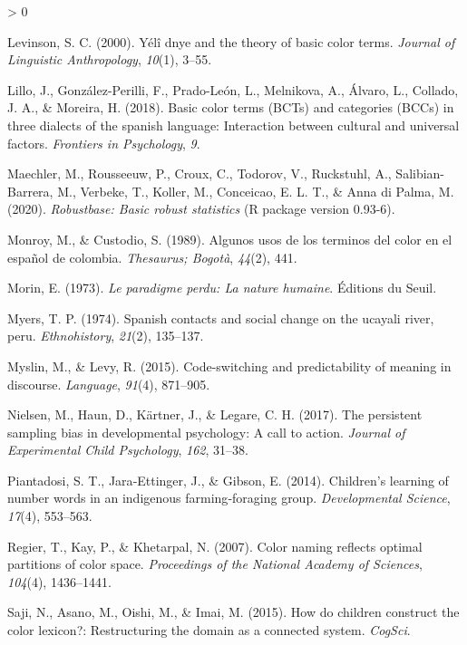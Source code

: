 \documentclass[
  english,
  ,apa7,floatsintext]{apa6}
\newlength{\cslhangindent}
\newenvironment{CSLReferences}[2] %
 {%
  \setlength{\parindent}{0pt}
  \ifodd #1 \everypar{\setlength{\hangindent}{\cslhangindent}}\ignorespaces\fi
  \ifnum #2 > 0
  \setlength{\parskip}{#2\baselineskip}
  \fi
 }%
 {}
\begin{document}
\begin{CSLReferences}{1}{0}
\leavevmode\hypertarget{ref-levinson2000}{}%
Levinson, S. C. (2000). Yélî dnye and the theory of basic color terms. \emph{Journal of Linguistic Anthropology}, \emph{10}(1), 3--55.

\leavevmode\hypertarget{ref-lillo2018}{}%
Lillo, J., González-Perilli, F., Prado-León, L., Melnikova, A., Álvaro, L., Collado, J. A., \& Moreira, H. (2018). Basic color terms (BCTs) and categories (BCCs) in three dialects of the spanish language: Interaction between cultural and universal factors. \emph{Frontiers in Psychology}, \emph{9}.

\leavevmode\hypertarget{ref-R-robustbase}{}%
Maechler, M., Rousseeuw, P., Croux, C., Todorov, V., Ruckstuhl, A., Salibian-Barrera, M., Verbeke, T., Koller, M., Conceicao, E. L. T., \& Anna di Palma, M. (2020). \emph{Robustbase: Basic robust statistics} (R package version 0.93-6).

\leavevmode\hypertarget{ref-monroy1989}{}%
Monroy, M., \& Custodio, S. (1989). Algunos usos de los terminos del color en el espa{ñ}ol de colombia. \emph{Thesaurus; Bogot{à}}, \emph{44}(2), 441.

\leavevmode\hypertarget{ref-morin1973}{}%
Morin, E. (1973). \emph{Le paradigme perdu: La nature humaine}. {É}ditions du Seuil.

\leavevmode\hypertarget{ref-Myers1974}{}%
Myers, T. P. (1974). Spanish contacts and social change on the ucayali river, peru. \emph{Ethnohistory}, \emph{21}(2), 135--137.

\leavevmode\hypertarget{ref-myslin2015}{}%
Myslin, M., \& Levy, R. (2015). Code-switching and predictability of meaning in discourse. \emph{Language}, \emph{91}(4), 871--905.

\leavevmode\hypertarget{ref-nielson2017}{}%
Nielsen, M., Haun, D., Kärtner, J., \& Legare, C. H. (2017). The persistent sampling bias in developmental psychology: A call to action. \emph{Journal of Experimental Child Psychology}, \emph{162}, 31--38.

\leavevmode\hypertarget{ref-piantadosi2014}{}%
Piantadosi, S. T., Jara‐Ettinger, J., \& Gibson, E. (2014). Children's learning of number words in an indigenous farming‐foraging group. \emph{Developmental Science}, \emph{17}(4), 553--563.

\leavevmode\hypertarget{ref-regier2007}{}%
Regier, T., Kay, P., \& Khetarpal, N. (2007). Color naming reflects optimal partitions of color space. \emph{Proceedings of the National Academy of Sciences}, \emph{104}(4), 1436--1441.

\leavevmode\hypertarget{ref-saji2015}{}%
Saji, N., Asano, M., Oishi, M., \& Imai, M. (2015). How do children construct the color lexicon?: Restructuring the domain as a connected system. \emph{CogSci}.


\end{CSLReferences}
\end{document}
